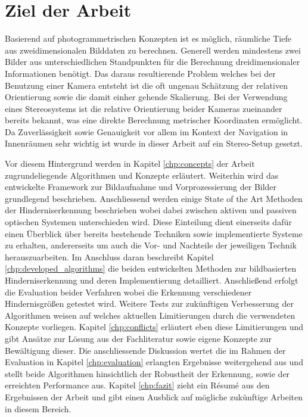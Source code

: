 \section{Ziel der Arbeit}
\label{sec:ziel_der_arbeit}
Basierend auf photogrammetrischen Konzepten ist es möglich, räumliche Tiefe aus zweidimensionalen Bilddaten zu berechnen. Generell werden mindestens zwei Bilder aus unterschiedlichen Standpunkten für die Berechnung dreidimensionaler Informationen benötigt. Das daraus resultierende Problem welches bei der Benutzung einer Kamera entsteht ist die oft ungenau Schätzung der relativen Orientierung sowie die damit einher gehende Skalierung. Bei der Verwendung eines Stereosystems ist die relative Orientierung beider Kameras zueinander bereits bekannt, was eine direkte Berechnung metrischer Koordinaten ermöglicht. Da Zuverlässigkeit sowie Genauigkeit vor allem im Kontext der Navigation in Innenräumen sehr wichtig ist wurde in dieser Arbeit auf ein Stereo-Setup gesetzt.

\noindent
Vor diesem Hintergrund werden in Kapitel \ref{chp:concepts} der Arbeit zugrundeliegende Algorithmen und Konzepte erläutert. Weiterhin wird das entwickelte Framework zur Bildaufnahme und Vorprozessierung der Bilder grundlegend beschrieben. Anschliessend werden einige State of the Art Methoden der Hinderniserkennung beschrieben wobei dabei zwischen aktiven und passiven optischen Systemen unterschieden wird. Diese Einteilung dient einerseits dafür einen Überblick über bereits bestehende Techniken sowie implementierte Systeme zu erhalten, andererseits um auch die Vor- und Nachteile der jeweiligen Technik herauszuarbeiten. Im Anschluss daran beschreibt Kapitel \ref{chp:developed_algorithms} die beiden entwickelten Methoden zur bildbasierten Hinderniserkennung und deren Implementierung detailliert. Anschließend erfolgt die Evaluation beider Verfahren wobei die Erkennung verschiedener Hindernisgrößen getestet wird. Weitere Tests zur zukünftigen Verbesserung der Algorithmen weisen auf welches aktuellen Limitierungen durch die verwendeten Konzepte vorliegen. Kapitel \ref{chp:conflicts} erläutert eben diese Limitierungen und gibt Ansätze zur Lösung aus der Fachliteratur sowie eigene Konzepte zur Bewältigung dieser. Die anschliessende Diskussion wertet die im Rahmen der Evaluation in Kapitel \ref{chp:evaluation} erlangten Ergebnisse weitergehend aus und stellt beide Algorithmen hinsichtlich der Robustheit der Erkennung, sowie der erreichten Performance aus. Kapitel \ref{chp:fazit} zieht ein Ré­su­mé aus den Ergebnissen der Arbeit und gibt einen Ausblick auf mögliche zukünftige Arbeiten in diesem Bereich.